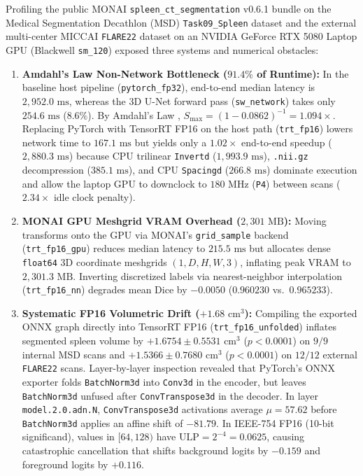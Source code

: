 \documentclass[10pt,twocolumn]{article}
\begin{document}
Profiling the public MONAI \texttt{spleen\_ct\_segmentation} v0.6.1 bundle \cite{monaibundle2024,xia2018} on the Medical Segmentation Decathlon (MSD) \texttt{Task09\_Spleen} dataset \cite{antonelli2022,simpson2019} and the external multi-center MICCAI \texttt{FLARE22} dataset \cite{ma2023flare} on an NVIDIA GeForce RTX 5080 Laptop GPU (Blackwell \texttt{sm\_120}) exposed three systems and numerical obstacles:
\begin{enumerate}
    \item \textbf{Amdahl's Law Non-Network Bottleneck ($91.4\%$ of Runtime):} In the baseline host pipeline (\texttt{pytorch\_fp32}), end-to-end median latency is $2,952.0\text{ ms}$, whereas the 3D U-Net forward pass (\texttt{sw\_network}) takes only $254.6\text{ ms}$ ($8.6\%$). By Amdahl's Law \cite{amdahl1967}, $S_{\max} = (1 - 0.0862)^{-1} = 1.094\times$. Replacing PyTorch with TensorRT FP16 on the host path (\texttt{trt\_fp16}) lowers network time to $167.1\text{ ms}$ but yields only a $1.02\times$ end-to-end speedup ($2,880.3\text{ ms}$) because CPU trilinear \texttt{Invertd} ($1,993.9\text{ ms}$), \texttt{.nii.gz} decompression ($385.1\text{ ms}$), and CPU \texttt{Spacingd} ($266.8\text{ ms}$) dominate execution and allow the laptop GPU to downclock to $180\text{ MHz}$ (\texttt{P4}) between scans ($2.34\times$ idle clock penalty).
    \item \textbf{MONAI GPU Meshgrid VRAM Overhead ($2,301\text{ MB}$):} Moving transforms onto the GPU via MONAI's \texttt{grid\_sample} backend (\texttt{trt\_fp16\_gpu}) reduces median latency to $215.5\text{ ms}$ but allocates dense \texttt{float64} 3D coordinate meshgrids $(1, D, H, W, 3)$, inflating peak VRAM to $2,301.3\text{ MB}$. Inverting discretized labels via nearest-neighbor interpolation (\texttt{trt\_fp16\_nn}) degrades mean Dice by $-0.0050$ ($0.960230$ vs.\ $0.965233$).
    \item \textbf{Systematic FP16 Volumetric Drift ($+1.68\text{ cm}^3$):} Compiling the exported ONNX graph directly into TensorRT FP16 (\texttt{trt\_fp16\_unfolded}) inflates segmented spleen volume by $+1.6754 \pm 0.5531\text{ cm}^3$ ($p < 0.0001$) on $9/9$ internal MSD scans and $+1.5366 \pm 0.7680\text{ cm}^3$ ($p < 0.0001$) on $12/12$ external \texttt{FLARE22} scans. Layer-by-layer inspection revealed that PyTorch's ONNX exporter folds \texttt{BatchNorm3d} into \texttt{Conv3d} in the encoder, but leaves \texttt{BatchNorm3d} unfused after \texttt{ConvTranspose3d} in the decoder. In layer \texttt{model.2.0.adn.N}, \texttt{ConvTranspose3d} activations average $\mu = 57.62$ before \texttt{BatchNorm3d} applies an affine shift of $-81.79$. In IEEE-754 FP16 (10-bit significand), values in $[64, 128)$ have $\text{ULP} = 2^{-4} = 0.0625$, causing catastrophic cancellation that shifts background logits by $-0.159$ and foreground logits by $+0.116$.
\end{enumerate}
\end{document}

